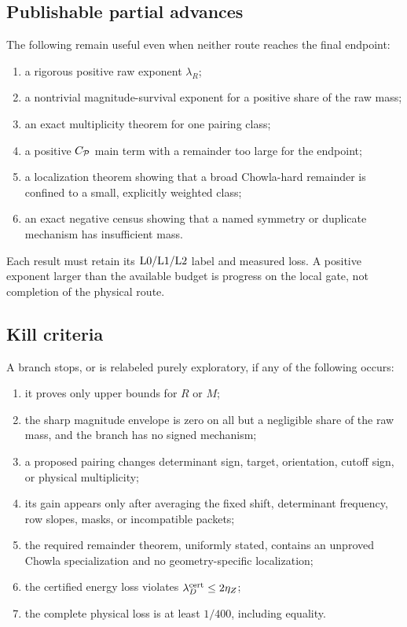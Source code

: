 \subsection{Publishable partial advances}

The following remain useful even when neither route reaches the final
endpoint:
\begin{enumerate}[leftmargin=2.2em]
 \item a rigorous positive raw exponent \(\lambda_R\);
 \item a nontrivial magnitude-survival exponent for a positive share
 of the raw mass;
 \item an exact multiplicity theorem for one pairing class;
 \item a positive \(C_{\mathcal P}\) main term with a remainder too large for
 the endpoint;
 \item a localization theorem showing that a broad Chowla-hard
 remainder is confined to a small, explicitly weighted class;
 \item an exact negative census showing that a named symmetry or
 duplicate mechanism has insufficient mass.
\end{enumerate}
Each result must retain its \(\mathrm{L0}/\mathrm{L1}/\mathrm{L2}\) label and measured
loss.  A positive exponent larger than the available budget is
progress on the local gate, not completion of the physical route.

\subsection{Kill criteria}

A branch stops, or is relabeled purely exploratory, if any of the
following occurs:
\begin{enumerate}[leftmargin=2.2em]
 \item it proves only upper bounds for \(R\) or \(M\);
 \item the sharp magnitude envelope is zero on all but a negligible
 share of the raw mass, and the branch has no signed mechanism;
 \item a proposed pairing changes determinant sign, target,
 orientation, cutoff sign, or physical multiplicity;
 \item its gain appears only after averaging the fixed shift,
 determinant frequency, row slopes, masks, or incompatible packets;
 \item the required remainder theorem, uniformly stated, contains an
 unproved Chowla specialization and no geometry-specific
 localization;
 \item the certified energy loss violates
 \(\lambda_D^{\rm cert}\le 2\eta_Z\);
 \item the complete physical loss is at least \(1/400\), including
 equality.
\end{enumerate}

